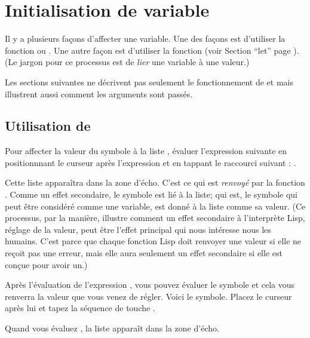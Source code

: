 \section{Initialisation de variable}

Il y a plusieurs façons d'affecter une variable. Une des façons est
d'utiliser la fonction  ou . Une autre façon est
d'utiliser la fonction  (voir Section  ``let''
page ). (Le jargon pour ce processus est de \textit{lier}
une variable à une valeur.)

Les sections suivantes ne décrivent pas seulement le fonctionnement de
 et  mais illustrent aussi comment les arguments sont
passés. 

\subsection{Utilisation de }

Pour affecter la valeur du symbole  à la liste , évaluer l'expression suivante en
positionnnant le curseur après l'expression et en tappant le raccourci
suivant : .


Cette liste  apparaîtra dans la zone
d'écho. C'est ce qui est \textit{renvoyé} par la fonction
. Comme un effet secondaire, le symbole  est lié à
la liste; qui est, le symbole  qui peut être considéré
comme une variable, est donné à la liste comme sa valeur. (Ce
processus, par la manière, illustre comment un effet secondaire à
l'interprète Lisp, réglage de la valeur, peut être l'effet principal
qui nous intéresse nous les humains. C'est parce que chaque
fonction Lisp doit renvoyer une valeur si elle ne reçoit pas une
erreur, mais elle aura seulement un effet secondaire si elle est conçue
pour avoir un.) 

Après l'évaluation de l'expression , vous pouvez évaluer le
symbole  et cela vous renverra la valeur que vous venez de
régler. Voici le symbole. Placez le curseur après lui et tapez la
séquence de touche .


Quand vous évaluez , la liste  apparaît dans la zone d'écho. 

